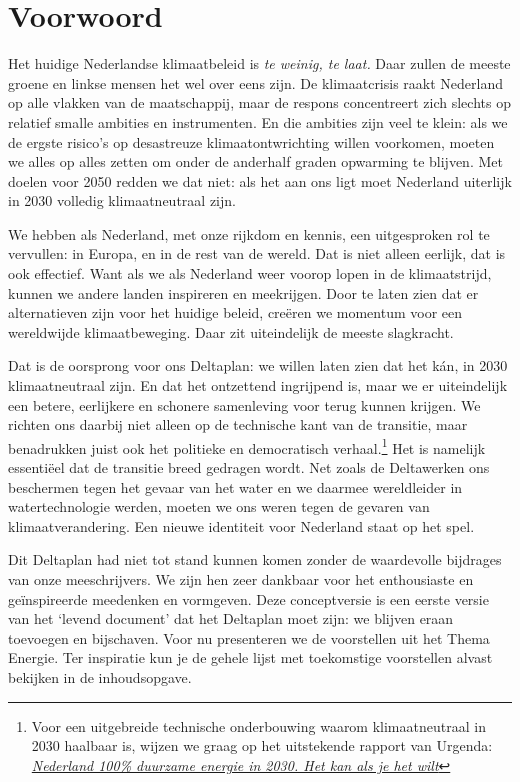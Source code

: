 \chapter{Voorwoord}

\begin{multicols}{2}

Het huidige Nederlandse klimaatbeleid is \emph{te weinig, te laat.}
Daar zullen de meeste groene en linkse mensen het wel over eens zijn.
De klimaatcrisis raakt Nederland op alle vlakken van de maatschappij, maar de respons concentreert zich slechts op relatief smalle ambities en instrumenten.
En die ambities zijn veel te klein: als we de ergste risico's op desastreuze klimaatontwrichting willen voorkomen, moeten we alles op alles zetten om onder de anderhalf graden opwarming te blijven.
Met doelen voor 2050 redden we dat niet: als het aan ons ligt moet Nederland uiterlijk in 2030 volledig klimaatneutraal zijn.

We hebben als Nederland, met onze rijkdom en kennis, een uitgesproken rol te vervullen: in Europa, en in de rest van de wereld.
Dat is niet alleen eerlijk, dat is ook effectief.
Want als we als Nederland weer voorop lopen in de klimaatstrijd, kunnen we andere landen inspireren en meekrijgen.
Door te laten zien dat er alternatieven zijn voor het huidige beleid, creëren we momentum voor een wereldwijde klimaatbeweging.
Daar zit uiteindelijk de meeste slagkracht.

Dat is de oorsprong voor ons Deltaplan: we willen laten zien dat het kán, in 2030 klimaatneutraal zijn.
En dat het ontzettend ingrijpend is, maar we er uiteindelijk een betere, eerlijkere en schonere samenleving voor terug kunnen krijgen.
We richten ons daarbij niet alleen op de technische kant van de transitie, maar benadrukken juist ook het politieke en democratisch verhaal.\footnote{Voor een uitgebreide technische onderbouwing waarom klimaatneutraal in 2030 haalbaar is, wijzen we graag op het uitstekende rapport van Urgenda: \href{https://www.urgenda.nl/visie/rapport-2030/}{\textit{Nederland 100\% duurzame energie in 2030. Het kan als je het wilt}}}
Het is namelijk essentiëel dat de transitie breed gedragen wordt.
Net zoals de Deltawerken ons beschermen tegen het gevaar van het water en we daarmee wereldleider in watertechnologie werden, moeten we ons weren tegen de gevaren van klimaatverandering.
Een nieuwe identiteit voor Nederland staat op het spel.

Dit Deltaplan had niet tot stand kunnen komen zonder de waardevolle bijdrages van onze meeschrijvers.
We zijn hen zeer dankbaar voor het enthousiaste en geïnspireerde meedenken en vormgeven.
Deze conceptversie is een eerste versie van het `levend document' dat het Deltaplan moet zijn: we blijven eraan toevoegen en bijschaven.
Voor nu presenteren we de voorstellen uit het Thema Energie.
Ter inspiratie kun je de gehele lijst met toekomstige voorstellen alvast bekijken in de inhoudsopgave.


\end{multicols}
